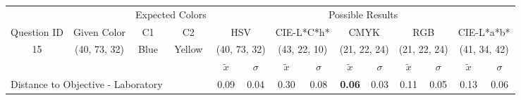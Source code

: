 \begin{table}[H]
  \resizebox{\textwidth}{!} {
  \begin{tabular}{lccccccccccccc}
    \hline
    \multicolumn{1}{c}{}                              &                                      & \multicolumn{2}{c}{Expected Colors}                   & \multicolumn{10}{c}{Possible Results}                                                                                                                                                                                                                                                                                        \\ \cline{3-14}
    \multicolumn{1}{c}{\multirow{-2}{*}{Question ID}} & \multirow{-2}{*}{Given Color}        & C1                       & C2                         & \multicolumn{2}{c}{HSV}                                        & \multicolumn{2}{c}{CIE-L*C*h*}                                 & \multicolumn{2}{c}{CMYK}                                       & \multicolumn{2}{c}{RGB}                                        & \multicolumn{2}{c}{CIE-L*a*b*}                                 \\ \hline
    \multicolumn{1}{c}{15}                             & \cellcolor[HTML]{00FF80}(40, 73, 32) & \multicolumn{1}{c|}{Blue} & \multicolumn{1}{c|}{Yellow}  & \multicolumn{2}{c|}{\cellcolor[HTML]{00FF80}(40, 73, 32)}      & \multicolumn{2}{c|}{\cellcolor[HTML]{FF0050}(43, 22, 10)}       & \multicolumn{2}{c|}{\cellcolor[HTML]{808080}(21, 22, 24)}       & \multicolumn{2}{c|}{\cellcolor[HTML]{808080}(21, 22, 24)}       & \multicolumn{2}{c|}{\cellcolor[HTML]{CA8AAA}(41, 34, 42)}       \\ \hline
                                                      & \multicolumn{1}{l}{}                 & \multicolumn{1}{l}{}     & \multicolumn{1}{l}{}       & \multicolumn{1}{c}{$\tilde{x}$} & \multicolumn{1}{c}{$\sigma$} & \multicolumn{1}{c}{$\tilde{x}$} & \multicolumn{1}{c}{$\sigma$} & \multicolumn{1}{c}{$\tilde{x}$} & \multicolumn{1}{c}{$\sigma$} & \multicolumn{1}{c}{$\tilde{x}$} & \multicolumn{1}{c}{$\sigma$} & \multicolumn{1}{c}{$\tilde{x}$} & \multicolumn{1}{c}{$\sigma$} \\ \hline
    \multicolumn{4}{l}{Distance to Objective - Laboratory}                                                                                           & \multicolumn{1}{|c}{0.09}       & \multicolumn{1}{c|}{0.04}    & \multicolumn{1}{|c}{0.30}       & \multicolumn{1}{c|}{0.08}    & \multicolumn{1}{|c}{\textbf{0.06}}       & \multicolumn{1}{c|}{0.03}    & \multicolumn{1}{|c}{0.11}       & \multicolumn{1}{c|}{0.05}    & \multicolumn{1}{|c}{0.13}       & \multicolumn{1}{c|}{0.06}    \\

\end{tabular}}
\end{table}
